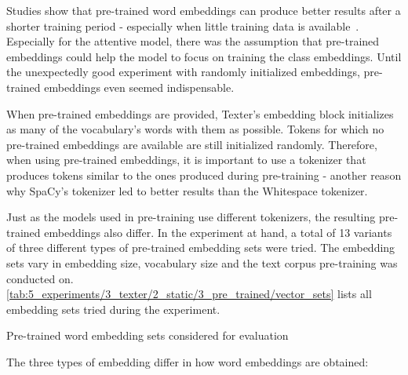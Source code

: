 Studies show that pre-trained word embeddings can produce better results after a shorter training period - especially when little training data is available~\cite{}. Especially for the attentive model, there was the assumption that pre-trained embeddings could help the model to focus on training the class embeddings. Until the unexpectedly good experiment with randomly initialized embeddings, pre-trained embeddings even seemed indispensable.

When pre-trained embeddings are provided, Texter's embedding block initializes as many of the vocabulary's words with them as possible. Tokens for which no pre-trained embeddings are available are still initialized randomly. Therefore, when using pre-trained embeddings, it is important to use a tokenizer that produces tokens similar to the ones produced during pre-training - another reason why SpaCy's tokenizer led to better results than the Whitespace tokenizer.

Just as the models used in pre-training use different tokenizers, the resulting pre-trained embeddings also differ. In the experiment at hand, a total of 13 variants of three different types of pre-trained embedding sets were tried. The embedding sets vary in embedding size, vocabulary size and the text corpus pre-training was conducted on. \autoref{tab:5_experiments/3_texter/2_static/3_pre_trained/vector_sets} lists all embedding sets tried during the experiment.

\begin{table}[t]
    \centering
    
    \caption{Pre-trained word embedding sets considered for evaluation}
    \label{tab:5_experiments/3_texter/2_static/3_pre_trained/vector_sets}
\end{table}

The three types of embedding differ in how word embeddings are obtained:

